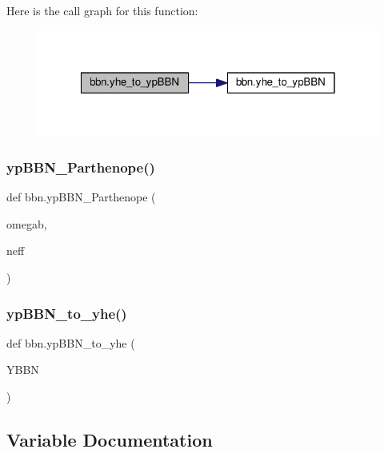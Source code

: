 Here is the call graph for this function\+:
\nopagebreak
\begin{figure}[H]
\begin{center}
\leavevmode
\includegraphics[width=320pt]{namespacebbn_a67d007a7323c319fdeaa32c288092939_cgraph}
\end{center}
\end{figure}
\mbox{\label{namespacebbn_a16582965b56bffa4937822750bf05aae}} 
\subsubsection{\texorpdfstring{yp\+B\+B\+N\+\_\+\+Parthenope()}{ypBBN\_Parthenope()}}
{\footnotesize\ttfamily def bbn.\+yp\+B\+B\+N\+\_\+\+Parthenope (\begin{DoxyParamCaption}\item[{}]{omegab,  }\item[{}]{neff }\end{DoxyParamCaption})}

\mbox{\label{namespacebbn_a1aba6aa3826014d84016987b47e11b9a}} 
\subsubsection{\texorpdfstring{yp\+B\+B\+N\+\_\+to\+\_\+yhe()}{ypBBN\_to\_yhe()}}
{\footnotesize\ttfamily def bbn.\+yp\+B\+B\+N\+\_\+to\+\_\+yhe (\begin{DoxyParamCaption}\item[{}]{Y\+B\+BN }\end{DoxyParamCaption})}



\subsection{Variable Documentation}
\mbox{\label{namespacebbn_a693a5d1e528c587feab5af05b0434b93}} 
